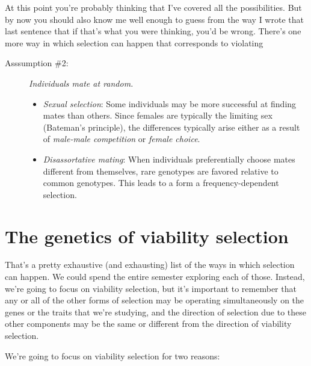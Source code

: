 At this point you're probably thinking that I've covered all the
possibilities. But by now you should also know me well enough to guess
from the way I wrote that last sentence that if that's what you were
thinking, you'd be wrong. There's one more way in which selection can
happen that corresponds to violating

\begin{description}

\item[Asssumption \#2:] {\it Individuals mate at random.}

\begin{itemize}

\item {\it Sexual selection\/}: Some individuals may be more
  successful at finding mates than others. Since females are typically
  the limiting sex (Bateman's principle), the differences typically
  arise either as a result of {\it male-male competition\/} or {\it
    female choice}.

\item {\it Disassortative mating\/}: When individuals preferentially
  choose mates different from themselves, rare genotypes are favored
  relative to common genotypes. This leads to a form a
  frequency-dependent selection.

\end{itemize}

\end{description}

\section*{The genetics of viability selection}

That's a pretty exhaustive (and exhausting) list of the ways in which
selection can happen. We could spend the entire semester exploring
each of those. Instead, we're going to focus on viability
selection, but it's important to remember that any or all of the other
forms of selection may be operating simultaneously on the genes or the
traits that we're studying, and the direction of selection due to
these other components may be the same or different from the direction
of viability selection.

We're going to focus on viability selection for two reasons:

